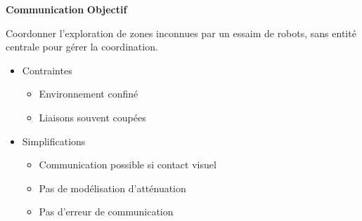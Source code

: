 \documentclass[aspectratio=169,10pt]{beamer}
\begin{document}
\begin{frame}{\textbf{Communication}}
	\textbf{Objectif}

	\vspace{0.5em}
	
	Coordonner l'exploration de zones inconnues par un essaim de robots, sans entité centrale pour gérer la coordination.
	
	\vspace{0.5em}

	\begin{itemize}
		\item Contraintes
		\begin{itemize}
			\item Environnement confiné
			\vspace{0.2cm}
			\item Liaisons souvent coupées
		\end{itemize}
		\vspace{0.2cm}
		\item Simplifications
		\begin{itemize}
			\item Communication possible si contact visuel
			\vspace{0.2cm}
			\item Pas de modélisation d'atténuation
			\vspace{0.2cm}
			\item Pas d'erreur de communication
		\end{itemize}
	\end{itemize}

\end{frame}
\end{document}
